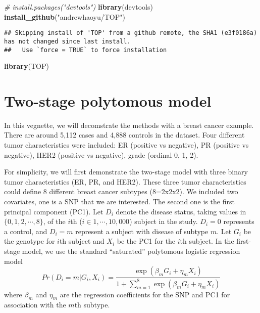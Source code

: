 \documentclass[11pt,]{article}
\newenvironment{Shaded}{\begin{snugshade}}{\end{snugshade}}
\newcommand{\CommentTok}[1]{\textcolor[rgb]{0.56,0.35,0.01}{\textit{#1}}}
\newcommand{\KeywordTok}[1]{\textcolor[rgb]{0.13,0.29,0.53}{\textbf{#1}}}
\newcommand{\NormalTok}[1]{#1}
\newcommand{\StringTok}[1]{\textcolor[rgb]{0.31,0.60,0.02}{#1}}
\begin{document}
\begin{Shaded}
\begin{Highlighting}[]
\CommentTok{# install.packages("devtools")}
\KeywordTok{library}\NormalTok{(devtools)  }
\KeywordTok{install_github}\NormalTok{(}\StringTok{"andrewhaoyu/TOP"}\NormalTok{)}
\end{Highlighting}
\end{Shaded}

\begin{verbatim}
## Skipping install of 'TOP' from a github remote, the SHA1 (e3f0186a) has not changed since last install.
##   Use `force = TRUE` to force installation
\end{verbatim}

\begin{Shaded}
\begin{Highlighting}[]
\KeywordTok{library}\NormalTok{(TOP)}
\end{Highlighting}
\end{Shaded}

\hypertarget{two-stage-polytomous-model}{%
\section{Two-stage polytomous model}\label{two-stage-polytomous-model}}

In this vegnette, we will decomstrate the methods with a breast cancer
example. There are around 5,112 cases and 4,888 controls in the dataset.
Four different tumor characteristics were included: ER (positive vs
negative), PR (positive vs negative), HER2 (positive vs negative), grade
(ordinal 0, 1, 2).

For simplicity, we will first demonstrate the two-stage model with three
binary tumor characteristics (ER, PR, and HER2). These three tumor
characteristics could define 8 different breast cancer subtypes
(8=2x2x2). We included two covariates, one is a SNP that we are
interested. The second one is the first principal component (PC1). Let
\(D_{i}\) denote the disease status, taking values in
\(\{0,1,2,\cdots,8\}\), of the \(i\)th (\(i \in 1, \cdots, 10,000\))
subject in the study. \(D_{i}=0\) represents a control, and \(D_{i}=m\)
represent a subject with disease of subtype \(m\). Let \(G_i\) be the
genotype for \(i\)th subject and \(X_i\) be the PC1 for the \(i\)th
subject. In the first-stage model, we use the standard ``saturated''
polytomous logistic regression model
\[ Pr(D_{i}=m|G_i,X_{i})=\frac{\exp(\beta_m G_i+\eta_m X_i)}{1+\sum_{m=1}^{8}\exp(\beta_m G_i+\eta_{m}X_{i})}\]
where \(\beta_{m}\) and \(\eta_{m}\) are the regression coefficients for
the SNP and PC1 for association with the \(m\)th subtype.
\end{document}
